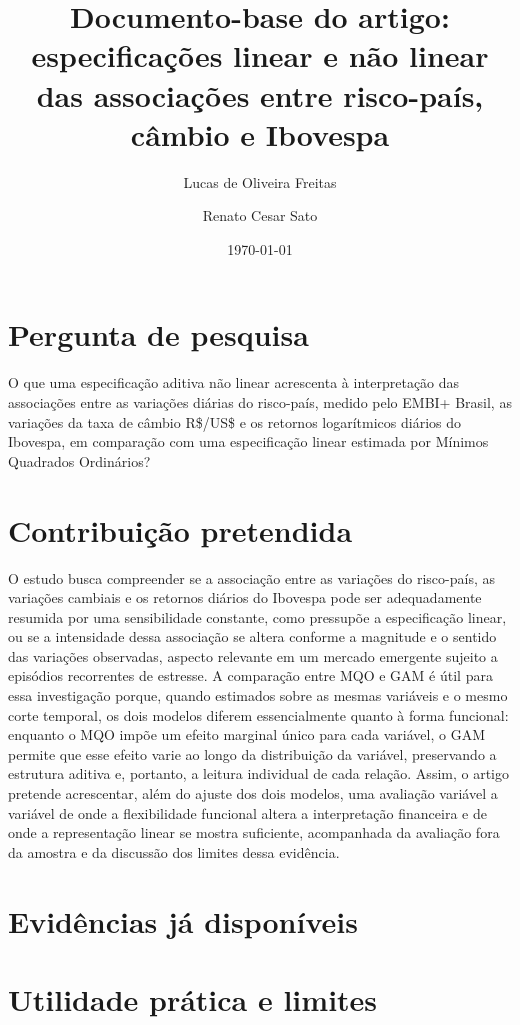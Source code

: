 \documentclass[11pt,a4paper]{article}
\title{Documento-base do artigo: especificações linear e não linear das associações entre risco-país, câmbio e Ibovespa}
\author{Lucas de Oliveira Freitas \and Renato Cesar Sato}
\date{\today}
\begin{document}
\maketitle

\section{Pergunta de pesquisa}

O que uma especificação aditiva não linear acrescenta à interpretação das associações entre as variações diárias do risco-país, medido pelo EMBI+ Brasil, as variações da taxa de câmbio R\$/US\$ e os retornos logarítmicos diários do Ibovespa, em comparação com uma especificação linear estimada por Mínimos Quadrados Ordinários?

\section{Contribuição pretendida}

O estudo busca compreender se a associação entre as variações do risco-país, as variações cambiais e os retornos diários do Ibovespa pode ser adequadamente resumida por uma sensibilidade constante, como pressupõe a especificação linear, ou se a intensidade dessa associação se altera conforme a magnitude e o sentido das variações observadas, aspecto relevante em um mercado emergente sujeito a episódios recorrentes de estresse. A comparação entre MQO e GAM é útil para essa investigação porque, quando estimados sobre as mesmas variáveis e o mesmo corte temporal, os dois modelos diferem essencialmente quanto à forma funcional: enquanto o MQO impõe um efeito marginal único para cada variável, o GAM permite que esse efeito varie ao longo da distribuição da variável, preservando a estrutura aditiva e, portanto, a leitura individual de cada relação. Assim, o artigo pretende acrescentar, além do ajuste dos dois modelos, uma avaliação variável a variável de onde a flexibilidade funcional altera a interpretação financeira e de onde a representação linear se mostra suficiente, acompanhada da avaliação fora da amostra e da discussão dos limites dessa evidência.

\section{Evidências já disponíveis}


\section{Utilidade prática e limites}
\end{document}
